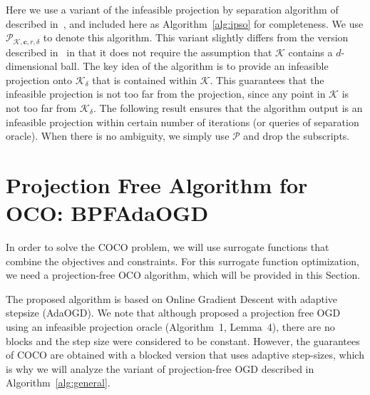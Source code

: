 \documentclass[twoside,11pt,]{article}
\newcommand{\C}[1]{\mathcal{#1}}
\newcommand{\BF}[1]{\mathbf{#1}}
\newcommand{\K}{\C{K}}
\renewcommand{\cite}[1]{\citep{#1}}
\begin{document}
Here we use a variant of the infeasible projection by separation algorithm of~\cite{garber2022new} described in~\cite{pedramfar2024linearizable}, and included here as Algorithm~\ref{alg:ipso} for completeness.
We use $\C{P}_{\K, \BF{c}, r, \delta}$ to denote this algorithm.
This variant slightly differs from the version described in~\cite{garber2022new} in that it does not require the assumption that $\K$ contains a $d$-dimensional ball.
The key idea of the algorithm is to provide an infeasible projection onto $\K_\delta$ that is contained within $\K$.
This guarantees that the infeasible projection is not too far from the projection, since any point in $\K$ is not too far from $\K_\delta$.
The following result ensures that the algorithm output is an infeasible projection within certain number of iterations (or queries of separation oracle). 
When there is no ambiguity, we simply use $\C{P}$ and drop the subscripts.




\section{Projection Free Algorithm for OCO: BPFAdaOGD}\label{sec:oco}

In order to solve the COCO problem, we will use surrogate functions that combine the objectives and constraints. For this surrogate function optimization, we need a projection-free OCO algorithm, which will be provided in this Section. 


The proposed algorithm is based on Online Gradient Descent with adaptive stepsize (AdaOGD). We note that although \cite{garber2022new} proposed a projection free OGD using an infeasible projection oracle (Algorithm~1, Lemma~4), there are no blocks and the step size were considered to be constant.
However, the guarantees of COCO are obtained with a blocked version that uses adaptive step-sizes, which is why we will analyze the variant of projection-free OGD described in Algorithm~\ref{alg:general}.
\end{document}
